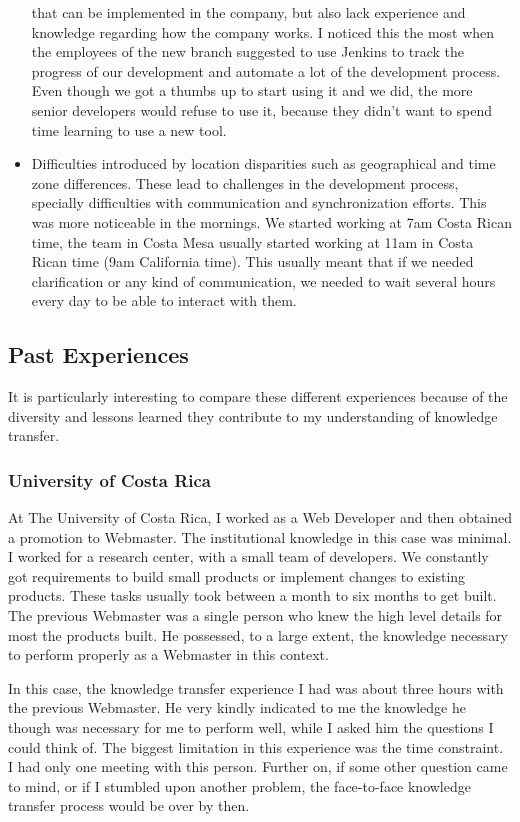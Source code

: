 \documentclass[12pt, letterpaper]{article}
\begin{document}
\begin{itemize}
  that can be implemented in the company, but also lack experience and knowledge regarding how the company works.
  I noticed this the most when the employees of the new branch suggested to use Jenkins to track the progress of our
  development and automate a lot of the development process. Even though we got a thumbs up to start using it and we did,
  the more senior developers would refuse to use it, because they didn't want to spend time learning to use a new tool.
  \item Difficulties introduced by location disparities such as geographical and time zone differences. These lead to 
  challenges in the development process, specially difficulties with communication and synchronization efforts.
  This was more noticeable in the mornings. We started working at 7am Costa Rican time, the team in Costa Mesa usually
  started working at 11am in Costa Rican time (9am California time). This usually meant that if we needed clarification
  or any kind of communication, we needed to wait several hours every day to be able to interact with them.
  
\end{itemize}

\subsection{Past Experiences}
It is particularly interesting to compare these different experiences because of the diversity and lessons learned
they contribute to my understanding of knowledge transfer.

\subsubsection{University of Costa Rica}
At The University of Costa Rica, I worked as a Web Developer and then obtained a promotion to Webmaster. 
The institutional knowledge in this case was minimal.
I worked for a research center, with a small team of developers. We constantly got requirements to build small products 
or implement changes to existing products. These tasks usually took between a month to six months to get built.
The previous Webmaster was a single person who knew the high level details for most the products built. He possessed, 
to a large extent, the knowledge necessary to perform properly as a Webmaster in this context.

In this case, the knowledge transfer experience I had was about three hours with the 
previous Webmaster. He very kindly
indicated to me the knowledge he though was necessary for me to perform well, while I asked him the questions I could 
think of. The biggest limitation in this experience was the time constraint. I had only one meeting with 
this person. Further on, if some other question came to mind, or if I stumbled upon another problem, the face-to-face knowledge
transfer process would be over by then.
\end{document}
